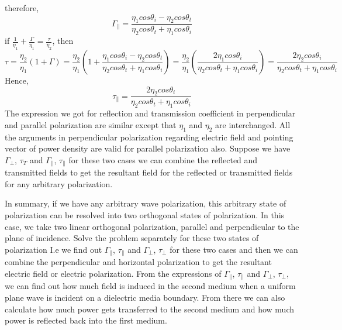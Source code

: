 therefore,
\begin{dmath}
\Gamma_{\parallel} = \frac{\eta_{1} cos\theta_{i} - \eta_{2} cos\theta_{t}}{\eta_{2} cos\theta_{t} + \eta_{1} cos\theta_{i}}
\end{dmath}
if $\frac{1}{\eta_{1}} + \frac{\Gamma}{\eta_{1}} = \frac{\tau}{\eta_{2}}$,  then 
\begin{dmath*}
\tau = \frac{\eta_{2}}{\eta_{1}} (1 + \Gamma)
= \frac{\eta_{2}}{\eta_{1}} (1 + \frac{\eta_{1} cos\theta_{i} - \eta_{2} cos\theta_{t}}{\eta_{2} cos\theta_{t} + \eta_{1} cos\theta_{i}})
= \frac{\eta_{2}}{\eta_{1}} (\frac{2\eta_{1} cos\theta_{i}}{\eta_{2} cos\theta_{t} + \eta_{1} cos\theta_{i}})
= \frac{2 \eta_{2} cos\theta_{i}}{\eta_{2} cos\theta_{t} + \eta_{1} cos\theta_{i}}
\end{dmath*}
Hence,
\begin{equation}
\tau_{\parallel} = \frac{2\eta_{2} cos\theta_{i} }{\eta_{2} cos\theta_{t} + \eta_{1} cos\theta_{i}} 
\end{equation}
The expression we got for reflection and transmission coefficient in perpendicular and parallel polarization are similar except that $\eta_{1}$ and $\eta_{2}$ are interchanged. All the arguments in perpendicular polarization regarding electric field and pointing vector of power density are valid for parallel polarization also. Suppose we have $\Gamma_{\perp}$, $\tau_{T}$ and $\Gamma_{\parallel}$, $\tau_{\parallel}$ for these two cases we can combine the reflected and transmitted fields to get the resultant field for the reflected or transmitted fields for any arbitrary polarization.

In summary, if we have any arbitrary wave polarization, this arbitrary state of polarization can be resolved into two orthogonal states of polarization. In this case, we take two linear orthogonal polarization, parallel and perpendicular to the plane of incidence. Solve the problem separately for these two states of polarization I.e we find out $\Gamma_{\parallel}$,  $\tau_{\parallel}$ and $\Gamma_{\perp}$, $\tau_{\perp}$ for these two cases and then we can combine the perpendicular and horizontal polarization to get the resultant electric field or electric polarization. From the expressions of $\Gamma_{\parallel}$,  $\tau_{\parallel}$ and $\Gamma_{\bot}$, $\tau_{\bot}$, we can find out how much field is induced in the second medium when a uniform plane wave is incident on a dielectric media boundary. From there we can also calculate how much power gets transferred to the second medium and how much power is reflected back into the first medium.

